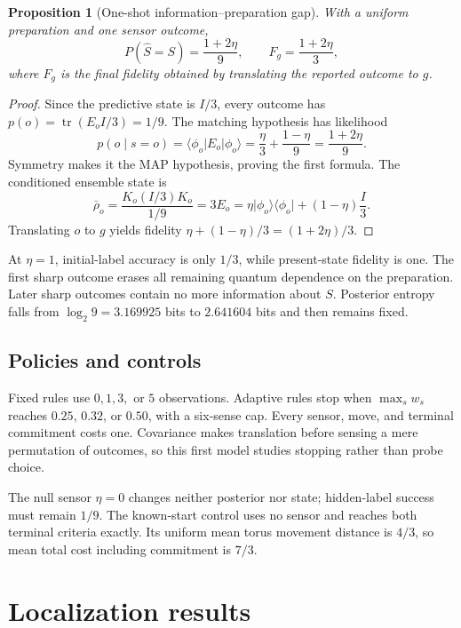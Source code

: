 \documentclass[11pt]{article}
\newtheorem{proposition}[theorem]{Proposition}
\theoremstyle{definition}\newtheorem{definition}[theorem]{Definition}
\theoremstyle{remark}\newtheorem{remark}[theorem]{Remark}
\newcommand{\tr}{\operatorname{tr}}
\newcommand{\ket}[1]{\lvert #1\rangle}
\newcommand{\bra}[1]{\langle #1\rvert}
\newcommand{\proj}[1]{\lvert #1\rangle\!\langle #1\rvert}
\begin{document}
\begin{proposition}[One-shot information--preparation gap]
\label{prop:one-shot}
With a uniform preparation and one sensor outcome,
\begin{equation}
P(\hat S=S)=\frac{1+2\eta}{9},\qquad
F_g=\frac{1+2\eta}{3},
\label{eq:one-shot}
\end{equation}
where \(F_g\) is the final fidelity obtained by translating the reported
outcome to \(g\).
\end{proposition}
\begin{proof}
Since the predictive state is \(I/3\), every outcome has
\(p(o)=\tr(E_oI/3)=1/9\). The matching hypothesis has likelihood
\[
p(o\mid s=o)=\bra{\phi_o}E_o\ket{\phi_o}
=\frac{\eta}{3}+\frac{1-\eta}{9}
=\frac{1+2\eta}{9}.
\]
Symmetry makes it the MAP hypothesis, proving the first formula. The
conditioned ensemble state is
\[
\bar\rho_o=\frac{K_o(I/3)K_o}{1/9}
=3E_o=\eta\proj{\phi_o}+(1-\eta)\frac I3.
\]
Translating \(o\) to \(g\) yields fidelity
\(\eta+(1-\eta)/3=(1+2\eta)/3\).
\end{proof}

At \(\eta=1\), initial-label accuracy is only \(1/3\), while present-state
fidelity is one. The first sharp outcome erases all remaining quantum
dependence on the preparation. Later sharp outcomes contain no more
information about \(S\). Posterior entropy falls from
\(\log_2 9=3.169925\) bits to \(2.641604\) bits and then remains fixed.

\subsection{Policies and controls}

Fixed rules use \(0,1,3,\) or \(5\) observations. Adaptive rules stop when
\(\max_sw_s\) reaches \(0.25\), \(0.32\), or \(0.50\), with a six-sense cap.
Every sensor, move, and terminal commitment costs one. Covariance makes
translation before sensing a mere permutation of outcomes, so this first model
studies stopping rather than probe choice.

The null sensor \(\eta=0\) changes neither posterior nor state; hidden-label
success must remain \(1/9\). The known-start control uses no sensor and reaches
both terminal criteria exactly. Its uniform mean torus movement distance is
\(4/3\), so mean total cost including commitment is \(7/3\).

\section{Localization results}
\label{sec:localization-results}
\end{document}
